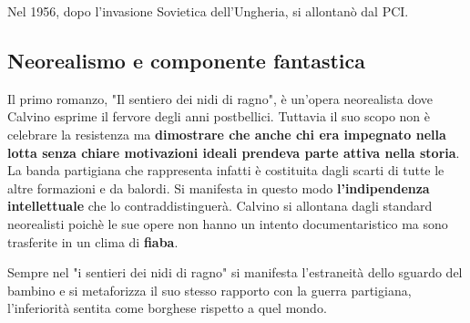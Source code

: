 \documentclass[10pt]{report}
\begin{document}
			Nel 1956, dopo l'invasione Sovietica dell'Ungheria, si allontanò dal PCI.
			
			\subsection{Neorealismo e componente fantastica}
			Il primo romanzo, "Il sentiero dei nidi di ragno", è un'opera neorealista dove Calvino esprime il fervore degli anni postbellici.
			Tuttavia il suo scopo non è celebrare la resistenza ma \textbf{dimostrare che anche chi era impegnato nella lotta senza chiare motivazioni ideali prendeva parte attiva nella storia}. La banda partigiana che rappresenta infatti è costituita dagli scarti di tutte le altre formazioni e da balordi. 
			Si manifesta in questo modo \textbf{l'indipendenza intellettuale} che lo contraddistinguerà.
			Calvino si allontana dagli standard neorealisti poichè le sue opere non hanno un intento documentaristico ma sono trasferite in un clima di \textbf{fiaba}.
			
			Sempre nel "i sentieri dei nidi di ragno" si manifesta l'estraneità dello sguardo del bambino e si metaforizza il suo stesso rapporto con la guerra partigiana, l'inferiorità sentita come borghese rispetto a quel mondo.
			
			
	
	

	
	
	
	
	
	
	
	
\end{document}
